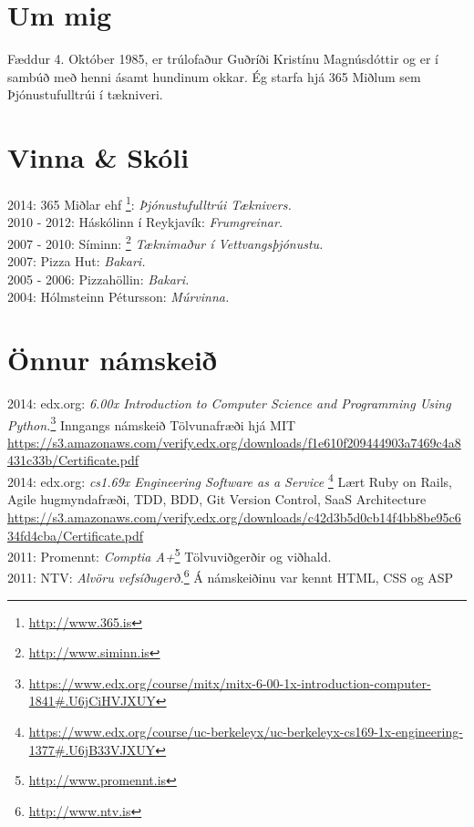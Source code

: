 \documentclass[margin]{res}
\begin{document}
\begin{resume} 
\section{Um mig}
Fæddur 4. Október 1985, er trúlofaður Guðríði Kristínu Magnúsdóttir og er í sambúð með henni ásamt hundinum okkar.
Ég starfa hjá 365 Miðlum sem Þjónustufulltrúi í tækniveri.

\section{Vinna \& Skóli}
2014: 365 Miðlar ehf \footnote{\url{http://www.365.is}}: \emph{Þjónustufulltrúi Tæknivers.}\\
2010 - 2012: Háskólinn í Reykjavík: \emph{Frumgreinar.}\\
2007 - 2010: Síminn: \footnote{\url{http://www.siminn.is}} \emph{Tæknimaður í Vettvangsþjónustu.}\\
2007: Pizza Hut: \emph{Bakari.}\\
2005 - 2006: Pizzahöllin: \emph{Bakari.}\\
2004: Hólmsteinn Pétursson: \emph{Múrvinna.}

\section{Önnur námskeið}
2014: edx.org: \emph{6.00x Introduction to Computer Science and Programming Using Python.}\footnote{\url{https://www.edx.org/course/mitx/mitx-6-00-1x-introduction-computer-1841\#.U6jCiHVJXUY}} Inngangs námskeið Tölvunafræði hjá MIT\\
\url{https://s3.amazonaws.com/verify.edx.org/downloads/f1e610f209444903a7469c4a8431c33b/Certificate.pdf}\\
2014: edx.org: \emph{cs1.69x Engineering Software as a Service} \footnote {\url{https://www.edx.org/course/uc-berkeleyx/uc-berkeleyx-cs169-1x-engineering-1377\#.U6jB33VJXUY}} Lært Ruby on Rails, Agile hugmyndafræði, TDD, BDD, Git Version Control, SaaS Architecture\\
\url{https://s3.amazonaws.com/verify.edx.org/downloads/c42d3b5d0cb14f4bb8be95c634fd4cba/Certificate.pdf}\\
2011: Promennt: \emph{Comptia A+}\footnote{\url{http://www.promennt.is}} Tölvuviðgerðir og viðhald.\\
2011: NTV: \emph{Alvöru vefsíðugerð.}\footnote{\url{http://www.ntv.is}} Á námskeiðinu var kennt HTML, CSS og ASP\\


\end{resume}
\end{document}
